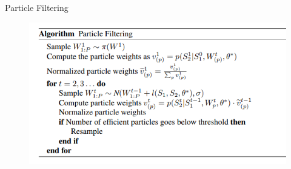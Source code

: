 \documentclass[aspectratio=169]{beamer}
\begin{document}
	\begin{frame}{Particle Filtering}
	    \begin{figure}
	        \centering
	        \includegraphics[scale = 0.8]{Particle_Filtering.png}
	    \end{figure}
	\end{frame}
	
\end{document}

